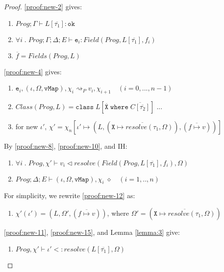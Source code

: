 \begin{proof}
\ref{proof:new-2} gives:
\begin{enumerate}[label=\arabic*), resume]
    \item \label{proof:new-7} $Prog; \Gamma \vdash L[\overline{\tau_1}] : \texttt{ok}$
    \item \label{proof:new-8} $\forall i \; . \; Prog; \Gamma; \Delta; E \vdash \texttt{e}_i : Field(Prog, L[\overline{\tau_1}], f_i)$
    \item \label{proof:new-9} $\overline{f} = Fields(Prog, L)$
\end{enumerate}
\ref{proof:new-4} gives:
\begin{enumerate}[label=\arabic*), resume]
    \item \label{proof:new-10} $\texttt{e}_i, (\iota, \Omega, \texttt{vMap}), \chi_i \rightsquigarrow_P v_i, \chi_{i+1} \quad (i = 0, ..., n-1)$
    \item \label{proof:new-11} $Class(Prog, L) = \texttt{class} \; L[\overline{\texttt{X}} \; \texttt{where} \; \overline{C[\overline{\tau_2}]}] \; ...$
    \item \label{proof:new-12} for new $\iota'$, $\chi' = \chi_n[\iota' \mapsto (L, (\overline{\texttt{X} \mapsto resolve(\tau_1, \Omega)}), (\overline{f \mapsto v}))]$
\end{enumerate}
By \ref{proof:new-8}, \ref{proof:new-10}, and IH:
\begin{enumerate}[label=\arabic*), resume]
    \item \label{proof:new-13} $\forall i \; . \; Prog, \chi' \vdash v_i \triangleleft resolve(Field(Prog, L[\overline{\tau_1}], f_i), \Omega)$
    \item \label{proof:new-14} $Prog; \Delta; E \vdash (\iota, \Omega, \texttt{vMap}), \chi_i \; \diamond \quad (i = 1, .., n)$
\end{enumerate}
For simplicity, we rewrite \ref{proof:new-12} as:
\begin{enumerate}[label=\arabic*), resume]
    \item \label{proof:new-15} $\chi'(\iota') = (L, \Omega', (\overline{f \mapsto v}))$, where $\Omega' = (\overline{\texttt{X} \mapsto resolve(\tau_1, \Omega)})$
\end{enumerate}
\ref{proof:new-11}, \ref{proof:new-15}, and Lemma \ref{lemma:3} give:
\begin{enumerate}[label=\arabic*), resume]
    \item \label{proof:new-16} $Prog, \chi' \vdash \iota' <: resolve(L[\overline{\tau_1}], \Omega)$

\end{enumerate}
\end{proof}
